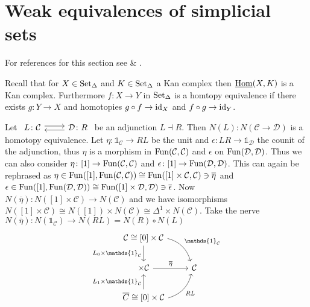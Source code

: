 \section{Weak equivalences of simplicial sets}

For references for this section see \cite[Section 3.1.6]{kerodon} \& \cite[Section 2.4]{Cisinski_2019}.

Recall that for $X \in \operatorname{Set}_{\Delta}$ and $K \in \operatorname{Set}_{\Delta}$ a Kan complex then $\underline{\operatorname{Hom}}(X,K)$ is a Kan complex.
Furthermore $f\colon X \to Y$ in $\operatorname{Set}_{\Delta}$ is a homtopy equivalence if there exists $g\colon Y \to X$ and homotopies $g \circ f \to \operatorname{id}_X$ and $ f \circ g \to \operatorname{id}_Y$.

\begin{exmp}
    Let $\begin{tikzcd}
            L \colon  \mathcal{C} 
            \arrow[r, shift left]
            &
            \mathcal{D} \colon R
            \arrow[l, shift left]
        \end{tikzcd}$
        be an adjunction $L \dashv R$.
        Then $N(L)\colon N( \mathcal{C} \to \mathcal{D})$ is a homotopy equivalence.
        Let $\eta \colon \mathds{1}_{\mathcal{C}} \to RL$ be the unit and $\epsilon\colon LR \to \mathds{1}_{\mathcal{D}}$ the counit of the adjunction, thus $\eta$ is a morphism in $\operatorname{Fun}( \mathcal{C} , \mathcal{C})$ and $\epsilon$ on $\operatorname{Fun}( \mathcal{D} , \mathcal{D} )$.
        Thus we can also consider $\eta \colon [1] \to \operatorname{Fun}(\mathcal{C},\mathcal{C})$ and $\epsilon \colon [1] \to \operatorname{Fun}(\mathcal{D},\mathcal{D})$.
        This can again be rephrased as $\eta \in \operatorname{Fun}( [1] , \operatorname{Fun}( \mathcal{C} , \mathcal{C})) \cong \operatorname{Fun} ( [1] \times \mathcal{C}, \mathcal{C}) \ni \overline{\eta}$ and $\epsilon \in \operatorname{Fun}( [1] , \operatorname{Fun}( \mathcal{D} , \mathcal{D})) \cong \operatorname{Fun} ( [1] \times \mathcal{D}, \mathcal{D}) \ni \overline{\epsilon}$.
        Now $N( \overline{\eta}) \colon N( [1] \times \mathcal{C}) \to N (\mathcal{C})$ and we have isomorphisms $N( [1] \times \mathcal{C}) \cong N([1]) \times N(\mathcal{C}) \cong \Delta^1 \times N(\mathcal{C})$.
        Take the nerve $N(\overline{\eta}) \colon N( \mathds{1}_{\mathcal{C}}) \to N(RL)= N(R) \circ N(L)$
        \[
        \begin{tikzcd}
            \mathcal{C} \cong [0] \times \mathcal{C}
            \ar[d, "L_0 \times \mathds{1}_{\mathcal{C}}"']
            \ar[rd, bend left, "\mathds{1}_{\mathcal{C}}"]
            \\
            [1] \times \mathcal{C}
            \ar[r, "\overline{\eta}"]
            &
            \mathcal{C}
            \\
            \overline{C}\cong [0] \times \mathcal{C} 
            \ar[u, "L_1 \times \mathds{1}_{\mathcal{C}}"]
            \ar[ru, bend right, "RL"']
        \end{tikzcd}
        \]
\end{exmp}

